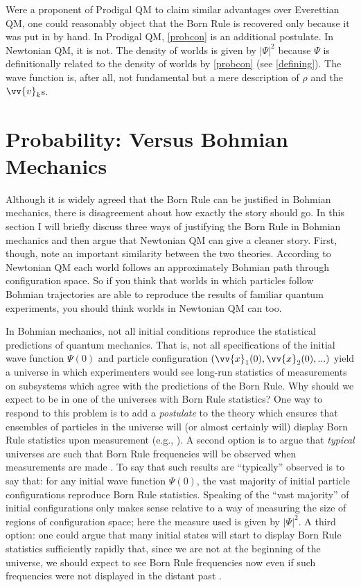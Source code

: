 \documentclass[onecolumn,secnumarabic,balancelastpage,amsmath,amssymb,nofootinbib]{article}
\begin{document}
Were a proponent of Prodigal QM to claim similar advantages over Everettian QM, one could reasonably object that the Born Rule is recovered only because it was put in by hand.  In Prodigal QM, \eqref{probcon} is an additional postulate.  In Newtonian QM, it is not.  The density of worlds is given by $|\Psi|^2$ because $\Psi$ is definitionally related to the density of worlds by \eqref{probcon}  (see \textsection \ref{defining}).  The wave function is, after all, not fundamental but a mere description of $\rho$ and the $\vv{v}_k$s.

\section{Probability: Versus Bohmian Mechanics}\label{probBOHM}

Although it is widely agreed that the Born Rule can be justified in Bohmian mechanics, there is disagreement about how exactly the story should go.  In this section I will briefly discuss three ways of justifying the Born Rule in Bohmian mechanics and then argue that Newtonian QM can give a cleaner story.  First, though, note an important similarity between the two theories.  According to Newtonian QM each world follows an approximately Bohmian path through configuration space.  So if you think that worlds in which particles follow Bohmian trajectories are able to reproduce the results of familiar quantum experiments, you should think worlds in Newtonian QM can too.

In Bohmian mechanics, not all initial conditions reproduce the statistical predictions of quantum mechanics.  That is, not all specifications of the initial wave function $\Psi(0)$ and particle configuration $(\vv{x}_1(0), \vv{x}_2(0), ...)$ yield a universe in which experimenters would see long-run statistics of measurements on subsystems which agree with the predictions of the Born Rule.  Why should we expect to be in one of the universes with Born Rule statistics?  One way to respond to this problem is to add a \emph{postulate} to the theory which ensures that ensembles of particles in the universe will (or almost certainly will) display Born Rule statistics upon measurement (e.g., \citealp[][.3]{holland}).  A second option is to argue that \emph{typical} universes are such that Born Rule frequencies will be observed when measurements are made \citep{durr1992}.  To say that such results are ``typically'' observed is to say that: for any initial wave function $\Psi(0)$, the vast majority of initial particle configurations reproduce Born Rule statistics.  Speaking of the ``vast majority'' of initial configurations only makes sense relative to a way of measuring the size of regions of configuration space; here the measure used is given by $|\Psi|^2$.  A third option: one could argue that many initial states will start to display Born Rule statistics sufficiently rapidly that, since we are not at the beginning of the universe, we should expect to see Born Rule frequencies now even if such frequencies were not displayed in the distant past \citep{valentini2005}.
\end{document}
